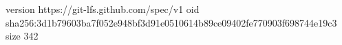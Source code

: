 version https://git-lfs.github.com/spec/v1
oid sha256:3d1b79603ba7f052e948bf3d91e0510614b89ce09402fe770903f698744e19c3
size 342
